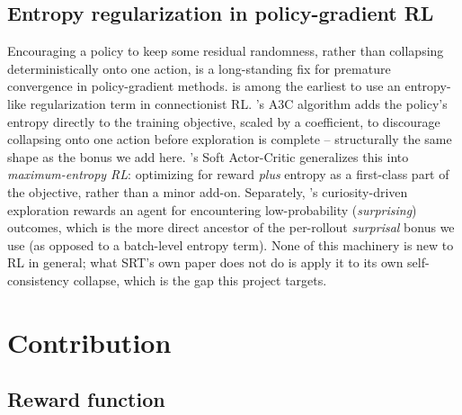 \documentclass{article}
\begin{document}
\subsection{Entropy regularization in policy-gradient RL}

Encouraging a policy to keep some residual randomness, rather than
collapsing deterministically onto one action, is a long-standing fix for
premature convergence in policy-gradient methods. \citet{williams1991function}
is among the earliest to use an entropy-like regularization term in
connectionist RL. \citet{mnih2016a3c}'s A3C algorithm adds the policy's
entropy directly to the training objective, scaled by a coefficient, to
discourage collapsing onto one action before exploration is complete --
structurally the same shape as the bonus we add here.
\citet{haarnoja2018sac}'s Soft Actor-Critic generalizes this into
\emph{maximum-entropy RL}: optimizing for reward \emph{plus} entropy as a
first-class part of the objective, rather than a minor add-on. Separately,
\citet{pathak2017curiosity}'s curiosity-driven exploration rewards an agent
for encountering low-probability (\emph{surprising}) outcomes, which is the
more direct ancestor of the per-rollout \emph{surprisal} bonus we use (as
opposed to a batch-level entropy term). None of this machinery is new to RL
in general; what SRT's own paper does not do is apply it to its own
self-consistency collapse, which is the gap this project targets.


\section{Contribution}
\label{sec:contribution}

\subsection{Reward function}
\end{document}
